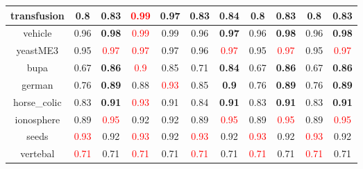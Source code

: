 \documentclass{article}%
\begin{document}
\begin{tabular}{c|cccccccccc}
\hline%
transfusion&0.8&\textbf{0.83}&\textcolor{red}{ 
0.99
}&0.97&0.83&\textbf{0.84}&0.8&\textbf{0.83}&0.8&\textbf{0.83}\\%
\hline%
vehicle&0.96&\textbf{0.98}&\textcolor{red}{ 
0.99
}&0.99&0.96&\textbf{0.97}&0.96&\textbf{0.98}&0.96&\textbf{0.98}\\%
\hline%
yeastME3&0.95&\textcolor{red}{ 
0.97
}&\textcolor{red}{ 
0.97
}&0.97&0.96&\textcolor{red}{ 
0.97
}&0.95&\textcolor{red}{ 
0.97
}&0.95&\textcolor{red}{ 
0.97
}\\%
\hline%
bupa&0.67&\textbf{0.86}&\textcolor{red}{ 
0.9
}&0.85&0.71&\textbf{0.84}&0.67&\textbf{0.86}&0.67&\textbf{0.86}\\%
\hline%
german&0.76&\textbf{0.89}&0.88&\textcolor{red}{ 
0.93
}&0.85&\textbf{0.9}&0.76&\textbf{0.89}&0.76&\textbf{0.89}\\%
\hline%
horse\_colic&0.83&\textbf{0.91}&\textcolor{red}{ 
0.93
}&0.91&0.84&\textbf{0.91}&0.83&\textbf{0.91}&0.83&\textbf{0.91}\\%
\hline%
ionosphere&0.89&\textcolor{red}{ 
0.95
}&0.92&0.92&0.89&\textcolor{red}{ 
0.95
}&0.89&\textcolor{red}{ 
0.95
}&0.89&\textcolor{red}{ 
0.95
}\\%
\hline%
seeds&\textcolor{red}{ 
0.93
}&0.92&\textcolor{red}{ 
0.93
}&0.92&\textcolor{red}{ 
0.93
}&0.92&\textcolor{red}{ 
0.93
}&0.92&\textcolor{red}{ 
0.93
}&0.92\\%
\hline%
vertebal&\textcolor{red}{ 
0.71
}&0.71&\textcolor{red}{ 
0.71
}&0.71&\textcolor{red}{ 
0.71
}&0.71&\textcolor{red}{ 
0.71
}&0.71&\textcolor{red}{ 
0.71
}&0.71\\%
\hline%
\end{tabular}

%
\end{document}
